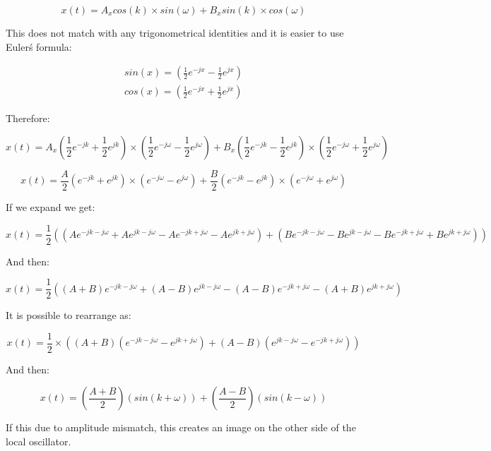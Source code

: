 \begin{equation}
x(t)=A_x cos(k)\times sin(\omega)+ B_x sin(k)\times cos(\omega)
\end{equation}

This does not match with any trigonometrical identities and it is easier to use Euler\'s formula:

\begin{eqnarray}
sin(x)=(\frac{1}{2}e^{-jx} - \frac{1}{2}e^{jx})\\
cos(x)=(\frac{1}{2}e^{-jx} + \frac{1}{2}e^{jx})
\end{eqnarray}

Therefore:

\begin{equation}
x(t)=A_x (\frac{1}{2}e^{-jk} + \frac{1}{2}e^{jk})\times (\frac{1}{2}e^{-j\omega} - \frac{1}{2}e^{j\omega})+ B_x (\frac{1}{2}e^{-jk} - \frac{1}{2}e^{jk})\times (\frac{1}{2}e^{-j\omega} + \frac{1}{2}e^{j\omega})
\end{equation}

\begin{equation}
x(t)=\frac{A}{2} (e^{-jk} + e^{jk})\times (e^{-j\omega} - e^{j\omega})+ \frac{B}{2} (e^{-jk} - e^{jk})\times (e^{-j\omega} + e^{j\omega})
\end{equation}

If we expand we get:

\begin{equation}
x(t)=\frac{1}{2} ((Ae^{-jk-j\omega} + Ae^{jk-j\omega} - Ae^{-jk+j\omega} - Ae^{jk+j\omega}) + (Be^{-jk-j\omega} - Be^{jk-j\omega} - Be^{-jk+j\omega} + Be^{jk+j\omega}))
\end{equation}


And then:

\begin{equation}
x(t)=\frac{1}{2} ((A+B)e^{-jk-j\omega} + (A-B)e^{jk-j\omega} - (A-B)e^{-jk+j\omega} - (A+B)e^{jk+j\omega})
\end{equation}

It is possible to rearrange as:

\begin{equation}
x(t)=\frac{1}{2} \times ((A+B)(e^{-jk-j\omega} - e^{jk+j\omega}) + (A-B)(e^{jk-j\omega} - e^{-jk+j\omega}))
\end{equation}

And then:

\begin{equation}
x(t)=(\frac{A+B}{2} )(sin(k+\omega)) + (\frac{A-B}{2} )(sin(k-\omega))
\end{equation}

If this due to amplitude mismatch, this creates an image on the other side of the local oscillator.




